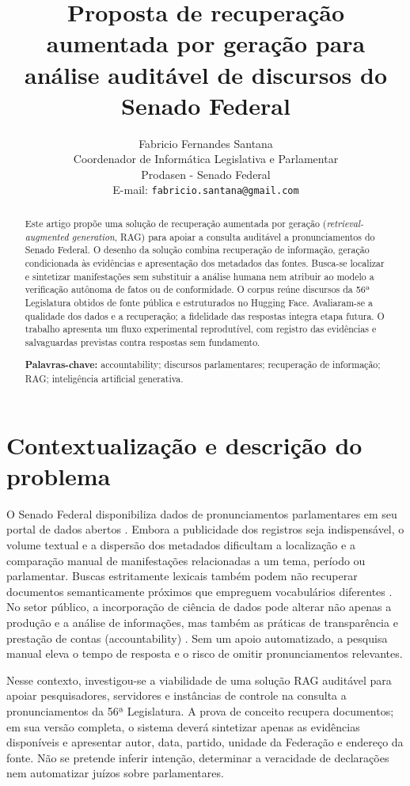 \documentclass[12pt,a4paper]{article}
\title{Proposta de recuperação aumentada por geração para análise auditável de discursos do Senado Federal}
\author{Fabricio Fernandes Santana\\
  \small Coordenador de Informática Legislativa e Parlamentar\\
  \small Prodasen - Senado Federal\\
  \small E-mail: \texttt{fabricio.santana@gmail.com}}
\date{}
\begin{document}
\maketitle

\begin{abstract}
Este artigo propõe uma solução de recuperação aumentada por geração
(\textit{retrieval-augmented generation}, RAG) para apoiar a consulta auditável
a pronunciamentos do Senado Federal. O desenho da solução combina recuperação
de informação, geração condicionada às evidências e apresentação dos metadados
das fontes. Busca-se localizar e sintetizar manifestações sem substituir a
análise humana nem atribuir ao modelo a verificação autônoma de fatos ou de
conformidade. O corpus reúne discursos da 56ª Legislatura obtidos de fonte
pública e estruturados no Hugging Face. Avaliaram-se a qualidade dos dados e a
recuperação; a fidelidade das respostas integra etapa futura. O trabalho
apresenta um fluxo experimental reprodutível, com registro das evidências e
salvaguardas previstas contra respostas sem fundamento.

\noindent\textbf{Palavras-chave:} accountability; discursos parlamentares;
recuperação de informação; RAG; inteligência artificial generativa.
\end{abstract}

\section{Contextualização e descrição do problema}

O Senado Federal disponibiliza dados de pronunciamentos parlamentares em seu
portal de dados abertos \cite{senadoDadosAbertos}. Embora a publicidade dos
registros seja indispensável, o volume textual e a dispersão dos metadados
dificultam a localização e a comparação manual de manifestações relacionadas a
um tema, período ou parlamentar. Buscas estritamente lexicais também podem não
recuperar documentos semanticamente próximos que empreguem vocabulários
diferentes \cite{manningEtAl2008informationRetrieval}.
No setor público, a incorporação de ciência de dados pode alterar não apenas a
produção e a análise de informações, mas também as práticas de transparência e
prestação de contas (accountability) \cite{agostinoEtAl2025dataScience}. Sem um
apoio automatizado, a pesquisa manual eleva o tempo de resposta e o risco de
omitir pronunciamentos relevantes.

Nesse contexto, investigou-se a viabilidade de uma solução RAG auditável para apoiar
pesquisadores, servidores e instâncias de controle na consulta a pronunciamentos
da 56ª Legislatura. A prova de conceito recupera documentos; em sua versão
completa, o sistema deverá sintetizar apenas as evidências disponíveis e
apresentar autor, data, partido,
unidade da Federação e endereço da fonte. Não se pretende inferir intenção,
determinar a veracidade de declarações nem automatizar juízos sobre parlamentares.
\end{document}
